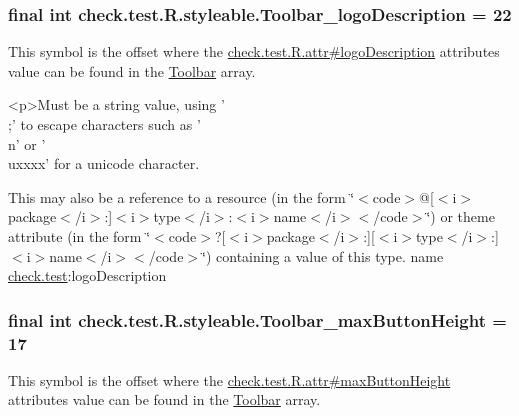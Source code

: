 \subsubsection[{Toolbar\+\_\+logo\+Description}]{\setlength{\rightskip}{0pt plus 5cm}final int check.\+test.\+R.\+styleable.\+Toolbar\+\_\+logo\+Description = 22\hspace{0.3cm}{\ttfamily [static]}}\label{classcheck_1_1test_1_1_r_1_1styleable_aa33122c1e3e1e09c60ff7a33506a08d8}
This symbol is the offset where the \hyperlink{classcheck_1_1test_1_1_r_1_1attr_a8ef51fc670409d939be8dfc4555f3d68}{check.\+test.\+R.\+attr\#logo\+Description} attribute\textquotesingle{}s value can be found in the \hyperlink{classcheck_1_1test_1_1_r_1_1styleable_a1a7fa90223693abef77e7484cca2df54}{Toolbar} array.

\begin{DoxyVerb}      <p>Must be a string value, using '\\;' to escape characters such as '\\n' or '\\uxxxx' for a unicode character.
\end{DoxyVerb}
 

This may also be a reference to a resource (in the form \char`\"{}$<$code$>$@\mbox{[}$<$i$>$package$<$/i$>$\+:\mbox{]}$<$i$>$type$<$/i$>$\+:$<$i$>$name$<$/i$>$$<$/code$>$\char`\"{}) or theme attribute (in the form \char`\"{}$<$code$>$?\mbox{[}$<$i$>$package$<$/i$>$\+:\mbox{]}\mbox{[}$<$i$>$type$<$/i$>$\+:\mbox{]}$<$i$>$name$<$/i$>$$<$/code$>$\char`\"{}) containing a value of this type.  name \hyperlink{namespacecheck_1_1test}{check.\+test}\+:logo\+Description \hypertarget{classcheck_1_1test_1_1_r_1_1styleable_a2a04c6b8bb844f8f793cb6990bd70a78}{}
\subsubsection[{Toolbar\+\_\+max\+Button\+Height}]{\setlength{\rightskip}{0pt plus 5cm}final int check.\+test.\+R.\+styleable.\+Toolbar\+\_\+max\+Button\+Height = 17\hspace{0.3cm}{\ttfamily [static]}}\label{classcheck_1_1test_1_1_r_1_1styleable_a2a04c6b8bb844f8f793cb6990bd70a78}
This symbol is the offset where the \hyperlink{classcheck_1_1test_1_1_r_1_1attr_abf227cf987d13435370f6f6bb9da1505}{check.\+test.\+R.\+attr\#max\+Button\+Height} attribute\textquotesingle{}s value can be found in the \hyperlink{classcheck_1_1test_1_1_r_1_1styleable_a1a7fa90223693abef77e7484cca2df54}{Toolbar} array.


